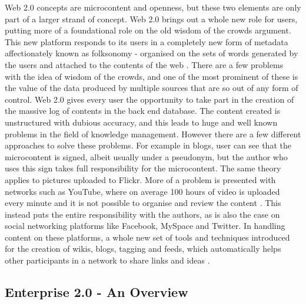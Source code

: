 Web 2.0 concepts are microcontent and openness, but these two elements are only part of a larger strand of concept. Web 2.0 brings out a whole new role for users, putting more of a foundational role on the old wisdom of the crowds argument. This new platform responds to its users in a completely new form of metadata affectionately known as folksonomy - organised on the sets of words generated by the users and attached to the contents of the web \cite{chen2014retracted}. There are a few problems with the idea of wisdom of the crowds, and one of the most prominent of these is the value of the data produced by multiple sources that are so out of any form of control. Web 2.0 gives every user the opportunity to take part in the creation of the massive log of contents in the back end database. The content created is unstructured with dubious accuracy, and this leads to huge and well known problems in the field of knowledge management. However there are a few different approaches to solve these problems. For example in blogs, user can see that the microcontent is signed, albeit usually under a pseudonym, but the author who uses this sign takes full responsibility for the microcontent. The same theory applies to pictures uploaded to Flickr. More of a problem is presented with networks such as YouTube, where on average 100 hours of video is uploaded every minute and it is not possible to organise and review the content \cite{youtube}. This instead puts the entire responsibility with the authors, as is also the case on social networking platforms like Facebook, MySpace and Twitter. In handling content on these platforms, a whole new set of tools and techniques introduced for the creation of wikis, blogs, tagging and feeds, which automatically helps other participants in a network to share links and ideas \cite{auer2007dbpedia}.

\subsection{Enterprise 2.0 - An Overview}

